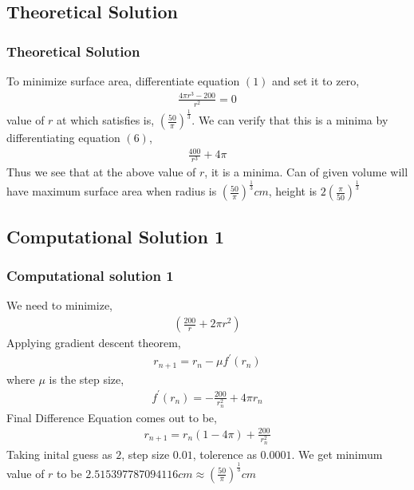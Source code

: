 \documentclass{beamer}
\providecommand{\brak}[1]{\ensuremath{\left(#1\right)}}
\theoremstyle{remark}
\numberwithin{equation}{section}
\begin{document}
		\subsection{Theoretical Solution}
		\begin{frame}
      \frametitle{Theoretical Solution}
To minimize surface area, differentiate equation $\brak{1}$ and set it to zero,
\begin{align}
  \frac{4\pi r^3 - 200}{r^2}=0
\end{align}
value of $r$ at which satisfies is, $\brak{\frac{50}{\pi}}^{\frac{1}{3}}$. We can verify that this is a minima by differentiating equation $\brak{6}$,
\begin{align}
  \frac{400}{r^3} + 4\pi
\end{align}
Thus we see that at the above value of $r$, it is a minima.\newline
Can of given volume will have maximum surface area when radius is $\brak{\frac{50}{\pi}}^{\frac{1}{3}} cm$, height is $2\brak{\frac{\pi}{50}}^{\frac{1}{3}}$\newline
    \end{frame}
        \subsection{Computational Solution 1}
			\begin{frame}
      \frametitle{Computational solution 1}
      {\small
We need to minimize,
\begin{align}
  \brak{\frac{200}{r} + 2\pi r^2}
\end{align}
Applying gradient descent theorem,
\begin{align}
  r_{n+1} = r_n -\mu f^{\prime}\brak{r_n}
\end{align}
where $\mu$ is the step size,
\begin{align}
  f^{\prime}\brak{r_n} = -\frac{200}{r_n^2} +4\pi r_n
\end{align}
Final Difference Equation comes out to be, 
\begin{align}
  r_{n+1} = r_n\brak{1 - 4\pi} + \frac{200}{r_n^2} 
\end{align}
Taking inital guess as $2$, step size $0.01$, tolerence as $0.0001$.\newline
We get minimum value of $r$ to be $2.515397787094116 cm \approx \brak{\frac{50}{\pi}}^{\frac{1}{3}} cm$
      }
    \end{frame}
		
\end{document}
